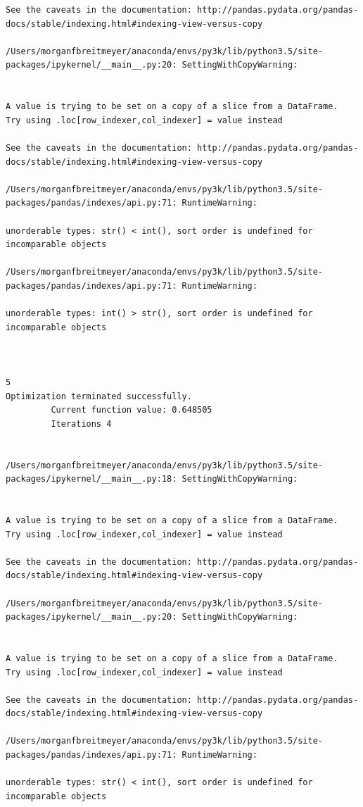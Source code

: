 \begin{lstlisting}
See the caveats in the documentation: http://pandas.pydata.org/pandas-docs/stable/indexing.html#indexing-view-versus-copy

/Users/morganfbreitmeyer/anaconda/envs/py3k/lib/python3.5/site-packages/ipykernel/__main__.py:20: SettingWithCopyWarning:


A value is trying to be set on a copy of a slice from a DataFrame.
Try using .loc[row_indexer,col_indexer] = value instead

See the caveats in the documentation: http://pandas.pydata.org/pandas-docs/stable/indexing.html#indexing-view-versus-copy

/Users/morganfbreitmeyer/anaconda/envs/py3k/lib/python3.5/site-packages/pandas/indexes/api.py:71: RuntimeWarning:

unorderable types: str() < int(), sort order is undefined for incomparable objects

/Users/morganfbreitmeyer/anaconda/envs/py3k/lib/python3.5/site-packages/pandas/indexes/api.py:71: RuntimeWarning:

unorderable types: int() > str(), sort order is undefined for incomparable objects



5
Optimization terminated successfully.
         Current function value: 0.648505
         Iterations 4


/Users/morganfbreitmeyer/anaconda/envs/py3k/lib/python3.5/site-packages/ipykernel/__main__.py:18: SettingWithCopyWarning:


A value is trying to be set on a copy of a slice from a DataFrame.
Try using .loc[row_indexer,col_indexer] = value instead

See the caveats in the documentation: http://pandas.pydata.org/pandas-docs/stable/indexing.html#indexing-view-versus-copy

/Users/morganfbreitmeyer/anaconda/envs/py3k/lib/python3.5/site-packages/ipykernel/__main__.py:20: SettingWithCopyWarning:


A value is trying to be set on a copy of a slice from a DataFrame.
Try using .loc[row_indexer,col_indexer] = value instead

See the caveats in the documentation: http://pandas.pydata.org/pandas-docs/stable/indexing.html#indexing-view-versus-copy

/Users/morganfbreitmeyer/anaconda/envs/py3k/lib/python3.5/site-packages/pandas/indexes/api.py:71: RuntimeWarning:

unorderable types: str() < int(), sort order is undefined for incomparable objects


\end{lstlisting}
